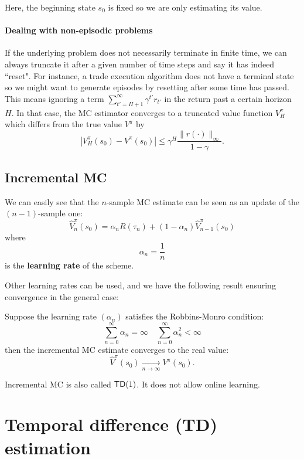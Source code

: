 \documentclass[../course-notes.tex]{subfiles}
\begin{document}
Here, the beginning state $s_0$ is fixed so we are only estimating its value.


\paragraph{Dealing with non-episodic problems} If the underlying problem does not necessarily terminate in finite time, we can always truncate it after a given number of time steps and say it has indeed ``reset". For instance, a trade execution algorithm does not have a terminal state so we might want to generate episodes by resetting after some time has passed. This means ignoring a term $\sum_{t'=H+1}^\infty \gamma^{t'} r_{t'}$ in the return past a certain horizon $H$. In that case, the MC estimator converges to a truncated value function $V_H^\pi$ which differs from the true value $V^\pi$ by
\[
	|V_H^\pi(s_0) - V^\pi(s_0)| \leq \gamma^H\frac{\| r(\cdot)\|_\infty}{1 - \gamma}.
\]


\subsection{Incremental MC}

We can easily see that the $n$-sample MC estimate can be seen as an update of the $(n-1)$-sample one:
\[
	\widehat{V}_{n}^\pi(s_0) = \alpha_n R(\tau_{n}) + (1-\alpha_n) \widehat{V}^\pi_{n-1}(s_0)
\]
where
\[
	\alpha_n = \frac{1}{n}
\]
is the \textbf{learning rate} of the scheme.

Other learning rates can be used, and we have the following result ensuring convergence in the general case:
\begin{prop}
	Suppose the learning rate $(\alpha_n)$ satisfies the Robbins-Monro condition:
	\begin{equation}
	\sum_{n=0}^{\infty} \alpha_n = \infty \quad
	\sum_{n=0}^{\infty} \alpha_n^2 < \infty
	\end{equation}
	then the incremental MC estimate converges to the real value:
	\[
		\widehat{V}^\pi(s_0) \xrightarrow[n\to\infty]{} V^\pi(s_0).
	\]
\end{prop}

Incremental MC is also called $\mathsf{TD}(1)$. It does not allow online learning.



\section{Temporal difference (TD) estimation}
\end{document}
